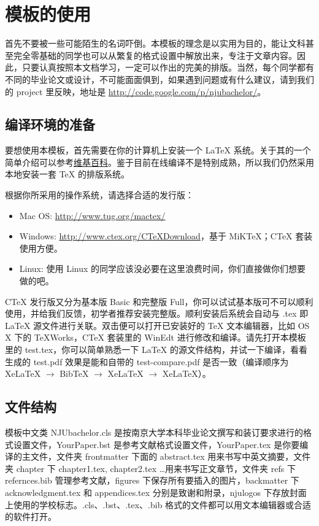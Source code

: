 \chapter{模板的使用}
首先不要被一些可能陌生的名词吓倒。本模板的理念是以实用为目的，能让文科甚至完全零基础的同学也可以从繁复的格式设置中解放出来，专注于文章内容。因此，只要认真按照本文档学习，一定可以作出的完美的排版。当然，每个同学都有不同的毕业论文或设计，不可能面面俱到，如果遇到问题或有什么建议，请到我们的 project 里反映，地址是 \url{http://code.google.com/p/njubachelor/}。

\section{编译环境的准备}
要想使用本模板，首先需要在你的计算机上安装一个 LaTeX 系统。关于其的一个简单介绍可以参考\href{http://zh.wikipedia.org/wiki/Latex}{维基百科}。鉴于目前在线编译不是特别成熟，所以我们仍然采用本地安装一套 \TeX{} 的排版系统。

根据你所采用的操作系统，请选择合适的发行版：
\begin{itemize}\label{text:eg}
	\item Mac OS: \url{http://www.tug.org/mactex/}
	\item Windows: \url{http://www.ctex.org/CTeXDownload}，基于 MiKTeX；CTeX 套装使用方便。
	\item Linux: 使用 Linux 的同学应该没必要在这里浪费时间，你们直接做你们想要做的吧。
\end{itemize}
CTeX 发行版又分为基本版 Basic 和完整版 Full，你可以试试基本版可不可以顺利使用，并给我们反馈，初学者推荐安装完整版。顺利安装后系统会自动与 .tex 即 LaTeX 源文件进行关联。双击便可以打开已安装好的 \TeX{} 文本编辑器，比如 OS X 下的 TeXWorks，CTeX 套装里的 WinEdt 进行修改和编译。请先打开本模板里的 test.tex，你可以简单熟悉一下 LaTeX 的源文件结构，并试一下编译，看看生成的 test.pdf 效果是能和自带的 test-compare.pdf 是否一致（编译顺序为 XeLaTeX $\rightarrow$ BibTeX $\rightarrow$ XeLaTeX $\rightarrow$ XeLaTeX）。

\section{文件结构}
模板中文类 NJUbachelor.cls 是按南京大学本科毕业论文撰写和装订要求进行的格式设置文件，YourPaper.bst 是参考文献格式设置文件，YourPaper.tex 是你要编译的主文件，文件夹 frontmatter 下面的 abstract.tex 用来书写中英文摘要，文件夹 chapter 下 chapter1.tex, chapter2.tex \ldots 用来书写正文章节，文件夹 refs 下 refernces.bib 管理参考文献，figures 下保存所有要插入的图片，backmatter 下 acknowledgment.tex 和 appendices.tex 分别是致谢和附录，njulogos 下存放封面上使用的学校标志。.cls、.bst、.tex、.bib 格式的文件都可以用文本编辑器或合适的软件打开。

